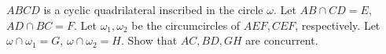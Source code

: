 $ABCD$ is a cyclic quadrilateral inscribed in the circle $\omega$. Let $AB \cap CD = E$, $AD \cap BC = F$. Let $\omega_1, \omega_2$ be the circumcircles of $AEF, CEF$, respectively. Let $\omega \cap \omega_1 = G$, $\omega \cap \omega_2 = H$. Show that $AC, BD, GH$ are concurrent.


